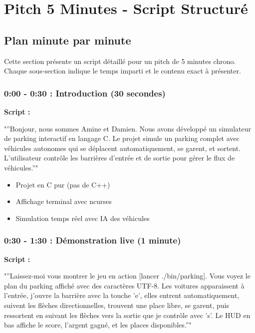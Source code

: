 \documentclass[12pt,a4paper]{article}
\newcommand{\sectiontime}[1]{%
    \textcolor{warningorange}{\textbf{#1}}
}
\begin{document}
\tableofcontents
\newpage

\section{Pitch 5 Minutes - Script Structuré}

\subsection{Plan minute par minute}

Cette section présente un script détaillé pour un pitch de 5 minutes chrono. Chaque sous-section indique le temps imparti et le contenu exact à présenter.

\subsubsection{\sectiontime{0:00 - 0:30} : Introduction (30 secondes)}

\begin{script_pitch}
\textbf{Script :}

"''Bonjour, nous sommes Amine et Damien. Nous avons développé un simulateur de parking interactif en langage C. Le projet simule un parking complet avec véhicules autonomes qui se déplacent automatiquement, se garent, et sortent. L'utilisateur contrôle les barrières d'entrée et de sortie pour gérer le flux de véhicules.''"
\end{script_pitch}

\begin{points_cles}
\begin{itemize}[leftmargin=0.5cm]
    \item Projet en C pur (pas de C++)
    \item Affichage terminal avec ncurses
    \item Simulation temps réel avec IA des véhicules
\end{itemize}
\end{points_cles}

\subsubsection{\sectiontime{0:30 - 1:30} : Démonstration live (1 minute)}

\begin{script_pitch}
\textbf{Script :}

"''Laissez-moi vous montrer le jeu en action [lancer ./bin/parking]. Vous voyez le plan du parking affiché avec des caractères UTF-8. Les voitures apparaissent à l'entrée, j'ouvre la barrière avec la touche 'e', elles entrent automatiquement, suivent les flèches directionnelles, trouvent une place libre, se garent, puis ressortent en suivant les flèches vers la sortie que je contrôle avec 's'. Le HUD en bas affiche le score, l'argent gagné, et les places disponibles.''"
\end{script_pitch}
\end{document}
